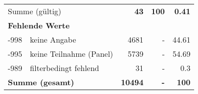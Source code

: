 \begin{longtable}{lXrrr}
     \midrule
     \multicolumn{2}{l}{Summe (gültig)} &
       \textbf{\num{43}} &
     \textbf{\num{100}} &
       \textbf{\num[round-mode=places,round-precision=2]{0.41}} \\
     \multicolumn{5}{l}{\textbf{Fehlende Werte}}\\
       -998 &
       keine Angabe &
         \num{4681} &
        - &
         \num[round-mode=places,round-precision=2]{44.61} \\
       -995 &
       keine Teilnahme (Panel) &
         \num{5739} &
        - &
         \num[round-mode=places,round-precision=2]{54.69} \\
       -989 &
       filterbedingt fehlend &
         \num{31} &
        - &
         \num[round-mode=places,round-precision=2]{0.3} \\
     \midrule
     \multicolumn{2}{l}{\textbf{Summe (gesamt)}} &
          \textbf{\num{10494}} &
        \textbf{-} &
        \textbf{\num{100}} \\
     \bottomrule
     \end{longtable}
     
